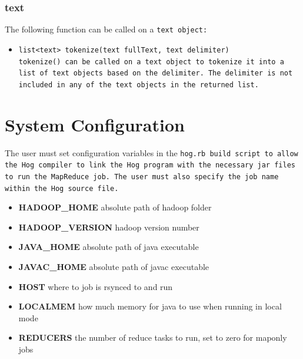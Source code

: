 \documentclass{article}
\begin{document}

\subsubsection{text} %
\label{ssub:text}

The following function can be called on a \tt text \rm object:

\begin{itemize}

\item[] \tt list<text> tokenize(text fullText, text delimiter) \rm \\

\tt tokenize() \rm can be called on a \tt text \rm object to tokenize it into a
list of \tt text \rm objects based on the delimiter. The delimiter is not included
in any of the \tt text \rm objects in the returned list.

\end{itemize}




\section{System Configuration} %
\label{sec:system_configuration}

The user must set configuration variables in the \tt hog.rb \rm build script to
allow the Hog compiler to link the Hog program with the necessary jar files to run
the MapReduce job. The user must also specify the job name within the Hog source
file.

\begin{itemize}

\item[] \textbf{HADOOP\_HOME} absolute path of hadoop folder
\item[] \textbf{HADOOP\_VERSION} hadoop version number
\item[] \textbf{JAVA\_HOME} absolute path of java executable
\item[] \textbf{JAVAC\_HOME} absolute path of javac executable
\item[] \textbf{HOST} where to job is rsynced to and run
\item[] \textbf{LOCALMEM} how much memory for java to use when running in local mode 
\item[] \textbf{REDUCERS} the number of reduce tasks to run, set to zero for map­only jobs

\end{itemize}
\end{document}
